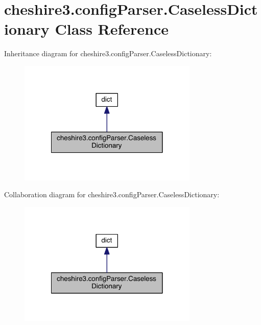 \hypertarget{classcheshire3_1_1config_parser_1_1_caseless_dictionary}{\section{cheshire3.\-config\-Parser.\-Caseless\-Dictionary Class Reference}
\label{classcheshire3_1_1config_parser_1_1_caseless_dictionary}
}


Inheritance diagram for cheshire3.\-config\-Parser.\-Caseless\-Dictionary\-:
\nopagebreak
\begin{figure}[H]
\begin{center}
\leavevmode
\includegraphics[width=242pt]{classcheshire3_1_1config_parser_1_1_caseless_dictionary__inherit__graph}
\end{center}
\end{figure}


Collaboration diagram for cheshire3.\-config\-Parser.\-Caseless\-Dictionary\-:
\nopagebreak
\begin{figure}[H]
\begin{center}
\leavevmode
\includegraphics[width=242pt]{classcheshire3_1_1config_parser_1_1_caseless_dictionary__coll__graph}
\end{center}
\end{figure}
